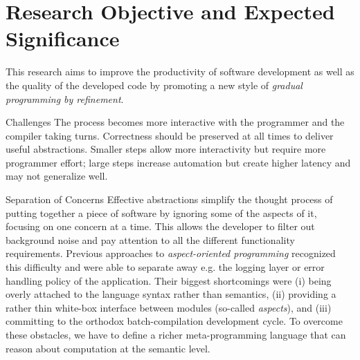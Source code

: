 \section{Research Objective and Expected Significance}

This research aims to improve the productivity of software development
as well as the quality of the developed code by promoting a new style
of \emph{gradual programming by refinement}.

\begin{paragraph}{Challenges}
The process becomes more interactive with the programmer and the
compiler taking turns. Correctness should be preserved at all times
to deliver useful abstractions.
Smaller steps allow more interactivity but require more programmer
effort; large steps increase automation but create higher latency
and may not generalize well.
\end{paragraph}

\begin{paragraph}{Separation of Concerns}
Effective abstractions simplify the thought process of putting together
a piece of software by ignoring some of the aspects of it, focusing on
one concern at a time. This allows the developer to filter out background
noise and pay attention to all the different functionality requirements.
Previous approaches to \emph{aspect-oriented programming} recognized this
difficulty and were able to separate away e.g. the logging layer or error
handling policy of the application. Their biggest shortcomings were 
(i) being overly attached to the language syntax rather than semantics, 
(ii) providing a rather thin white-box interface between modules
    (so-called \emph{aspects}), and
(iii) committing to the orthodox batch-compilation development cycle.
To overcome these obstacles, we have to define a richer meta-programming
language that can reason about computation at the semantic level.
\end{paragraph}